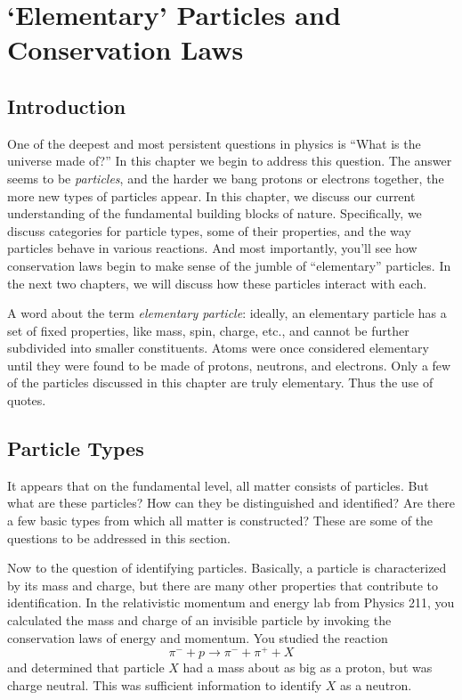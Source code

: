 

\chapter[Particles and Conservation Laws]{`Elementary' Particles and
Conservation Laws}
\label{chapter:particles}

\section{Introduction}
\label{sec:particles:intro}

One of the deepest and most persistent questions in physics is
``What is the universe made of?''  In this chapter we begin to
address this question.  The answer seems to be {\em particles},
and the harder we bang protons or electrons together, the more new
types of particles appear. In this chapter, we discuss our current
understanding of the fundamental building blocks of nature.
Specifically, we discuss categories for particle types, some of
their properties, and the way particles behave in various
reactions. And most importantly, you'll see how conservation laws
begin to make sense of the jumble of ``elementary'' particles.  In
the next two chapters, we will discuss how these particles
interact with each.

A word about the term {\em elementary particle}: ideally, an elementary
particle has a set of fixed properties, like mass, spin, charge, etc.,
and cannot be further subdivided into smaller constituents.  Atoms
were once considered elementary until they were found to be made of
protons, neutrons, and electrons.  Only a few of the particles
discussed in this chapter are truly elementary.  Thus the use of
quotes.

\section{Particle Types}
\label{sec:particle_types}

It appears that on the fundamental level, all matter consists of
particles. But what are these particles?  How can they be
distinguished and identified?  Are there a few basic types from
which all matter is constructed?  These are some of the questions
to be addressed in this section.

Now to the question of identifying particles.  Basically, a particle
is characterized by its mass and charge, but there are many other
properties that contribute to identification.  In the relativistic
momentum and energy lab from Physics 211, you calculated the mass and
charge of an invisible particle by invoking the conservation laws of
energy and momentum.  You studied the reaction
\begin{equation}
\pi^- + p \to \pi^- + \pi^+ + X
\end{equation}
and determined that particle $X$ had a mass about as big as a proton,
but was charge neutral.  This was sufficient information to identify
$X$ as a neutron.


